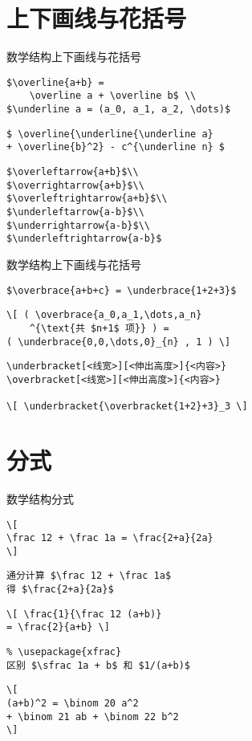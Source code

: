 \documentclass[11pt]{beamer}
\begin{document}
\section{上下画线与花括号}

\begin{frame}[fragile]{数学结构}{上下画线与花括号}
\begin{lstlisting}
$\overline{a+b} =
	\overline a + \overline b$ \\
$\underline a = (a_0, a_1, a_2, \dots)$
\end{lstlisting}
\begin{lstlisting}
$ \overline{\underline{\underline a}
+ \overline{b}^2} - c^{\underline n} $
\end{lstlisting}
\begin{lstlisting}
$\overleftarrow{a+b}$\\
$\overrightarrow{a+b}$\\
$\overleftrightarrow{a+b}$\\
$\underleftarrow{a-b}$\\
$\underrightarrow{a-b}$\\
$\underleftrightarrow{a-b}$
\end{lstlisting}
\end{frame}

\begin{frame}[fragile]{数学结构}{上下画线与花括号}
\begin{lstlisting}
$\overbrace{a+b+c} = \underbrace{1+2+3}$
\end{lstlisting}
\begin{lstlisting}
\[ ( \overbrace{a_0,a_1,\dots,a_n}
	^{\text{共 $n+1$ 项}} ) =
( \underbrace{0,0,\dots,0}_{n} , 1 ) \]
\end{lstlisting}
\begin{lstlisting}
\underbracket[<线宽>][<伸出高度>]{<内容>}
\overbracket[<线宽>][<伸出高度>]{<内容>}

\[ \underbracket{\overbracket{1+2}+3}_3 \]
\end{lstlisting}
\end{frame}

\section{分式}

\begin{frame}[fragile]{数学结构}{分式}
\begin{lstlisting}
\[
\frac 12 + \frac 1a = \frac{2+a}{2a}
\]
\end{lstlisting}
\begin{lstlisting}
通分计算 $\frac 12 + \frac 1a$
得 $\frac{2+a}{2a}$
\end{lstlisting}
\begin{lstlisting}
\[ \frac{1}{\frac 12 (a+b)}
= \frac{2}{a+b} \]
\end{lstlisting}
\begin{lstlisting}
% \usepackage{xfrac}
区别 $\sfrac 1a + b$ 和 $1/(a+b)$
\end{lstlisting}
\begin{lstlisting}
\[
(a+b)^2 = \binom 20 a^2
+ \binom 21 ab + \binom 22 b^2
\]
\end{lstlisting}
\end{frame}
\end{document}

